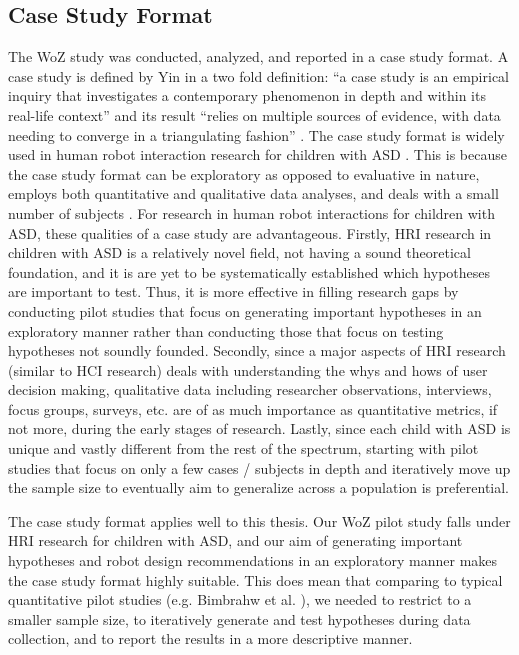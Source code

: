 \subsection{Case Study Format}
The WoZ study was conducted, analyzed, and reported in a case study format.  A case study is defined by Yin in a two fold definition: ``a case study is an empirical inquiry that investigates a contemporary phenomenon in depth and within its real-life context'' and its result ``relies on multiple sources of evidence, with data needing to converge in a triangulating fashion'' \cite{yin2013case}.  The case study format is widely used in human robot interaction research for children with ASD \cite{kozima2005interactive, robins2004robot, robins2009isolation}.  This is because the case study format can be exploratory as opposed to evaluative in nature, employs both quantitative and qualitative data analyses, and deals with a small number of subjects \cite{yin2013case}.  For research in human robot interactions for children with ASD, these qualities of a case study are advantageous.  Firstly, HRI research in children with ASD is a relatively novel field, not having a sound theoretical foundation, and it is are yet to be systematically established which hypotheses are important to test.  Thus, it is more effective in filling research gaps by conducting pilot studies that focus on generating important hypotheses in an exploratory manner rather than conducting those that focus on testing hypotheses not soundly founded.  Secondly, since a major aspects of HRI research (similar to HCI research) deals with understanding the whys and hows of user decision making, qualitative data including researcher observations, interviews, focus groups, surveys, etc. are of as much importance as quantitative metrics, if not more, during the early stages of research.  Lastly, since each child with ASD is unique and vastly different from the rest of the spectrum, starting with pilot studies that focus on only a few cases / subjects in depth and iteratively move up the sample size to eventually aim to generalize across a population is preferential.

The case study format applies well to this thesis.  Our WoZ pilot study falls under HRI research for children with ASD, and our aim of generating important hypotheses and robot design recommendations in an exploratory manner makes the case study format highly suitable.  This does mean that comparing to typical quantitative pilot studies (e.g. Bimbrahw et al. \cite{bimbrahw2012investigating}), we needed to restrict to a smaller sample size, to iteratively generate and test hypotheses during data collection, and to report the results in a more descriptive manner.

